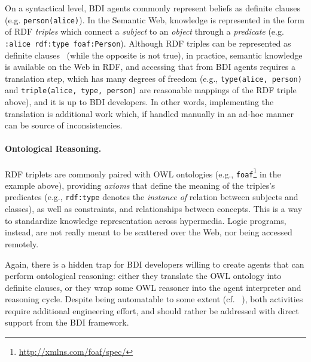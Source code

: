 \documentclass[
]{ceurart}
\begin{document}
On a syntactical level, 
\ac{BDI} agents commonly represent beliefs as definite clauses\missingref{} %
(e.g. \texttt{person(alice)}).
%
In the Semantic Web, 
knowledge is represented in the form of \ac{RDF} \emph{triples} which connect a \emph{subject} to an \emph{object} through a \emph{predicate} (e.g. \texttt{:alice rdf:type foaf:Person}).
%
Although \ac{RDF} triples can be represented as definite clauses~\cite{DBLP:conf/www/GrosofHVD03}
(while the opposite is not true), 
in practice,
semantic knowledge is available on the Web in \ac{RDF},
and accessing that from \ac{BDI} agents requires a translation step,
which has many degrees of freedom
(e.g., \texttt{type(alice, person)} and \texttt{triple(alice, type, person)} are reasonable mappings of the \ac{RDF} triple above),
and it is up to \ac{BDI} developers.
%
In other words,
implementing the translation is additional work which, if handled manually in an ad-hoc manner can be source of inconsistencies.

\paragraph{Ontological Reasoning.}

\ac{RDF} triplets are commonly paired with \ac{OWL} ontologies (e.g., \texttt{foaf}\footnote{\url{http://xmlns.com/foaf/spec/}} in the example above),
providing \emph{axioms} that define the meaning of the triples's predicates 
(e.g., \texttt{rdf:type} denotes the \emph{instance of} relation between subjects and classes),
as well as constraints, and relationships between concepts.
%
This is a way to standardize knowledge representation across hypermedia.
%
Logic programs, instead, are not really meant to be scattered over the Web,
nor being accessed remotely.

Again,
there is a hidden trap for \ac{BDI} developers willing to create agents that can perform ontological reasoning:
either they translate the \ac{OWL} ontology into definite clauses,
or they wrap some \ac{OWL} reasoner into the agent interpreter and reasoning cycle.
%
Despite being automatable to some extent (cf. ~\cite{samuel2008tplp}),
both activities require additional engineering effort,
and should rather be addressed with direct support from the \ac{BDI} framework.
\end{document}
